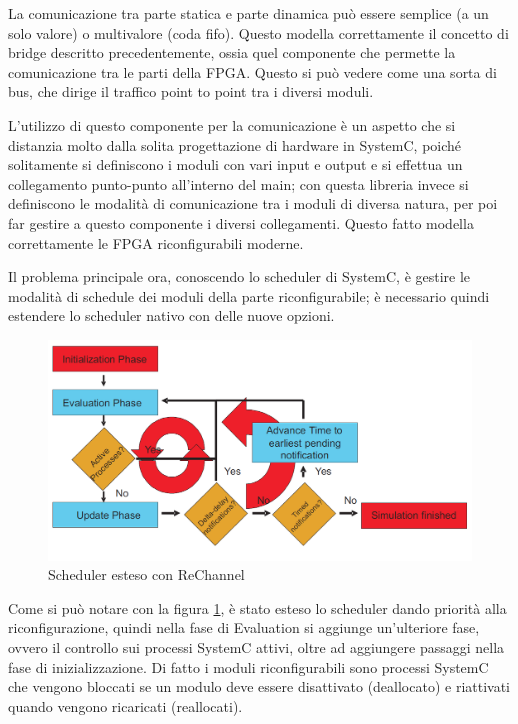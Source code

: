 \documentclass[a4paper,titlepage]{book}
\begin{document}
La comunicazione tra parte statica e parte dinamica può essere semplice (a un solo valore) o multivalore (coda fifo). Questo modella correttamente il concetto di bridge descritto precedentemente, ossia quel componente che permette la comunicazione tra le parti della FPGA. Questo si può vedere come una sorta di bus, che dirige il traffico point to point tra i diversi moduli.

L'utilizzo di questo componente per la comunicazione è un aspetto che si distanzia molto dalla solita progettazione di hardware in SystemC, poiché solitamente si definiscono i moduli con vari input e output e si effettua un collegamento punto-punto all'interno del main; con questa libreria invece si definiscono le modalità di comunicazione tra i moduli di diversa natura, per poi far gestire a questo componente i diversi collegamenti. Questo fatto modella correttamente le FPGA riconfigurabili moderne.

Il problema principale ora, conoscendo lo scheduler di SystemC, è gestire le modalità di schedule dei moduli della parte riconfigurabile; è necessario quindi estendere lo scheduler nativo con delle nuove opzioni.

\begin{figure}[ht]
\centering
\includegraphics[scale=0.5]{scheduler_rechannel.png}
\caption{Scheduler esteso con ReChannel}\label{fig:4}
\end{figure}

Come si può notare con la figura \ref{fig:4}, è stato esteso lo scheduler dando priorità alla riconfigurazione, quindi nella fase di Evaluation si aggiunge un'ulteriore fase, ovvero il controllo sui processi SystemC attivi, oltre ad aggiungere passaggi nella fase di inizializzazione. Di fatto i moduli riconfigurabili sono processi SystemC che vengono bloccati se un modulo deve essere disattivato (deallocato) e riattivati quando vengono ricaricati (reallocati).
\end{document}
